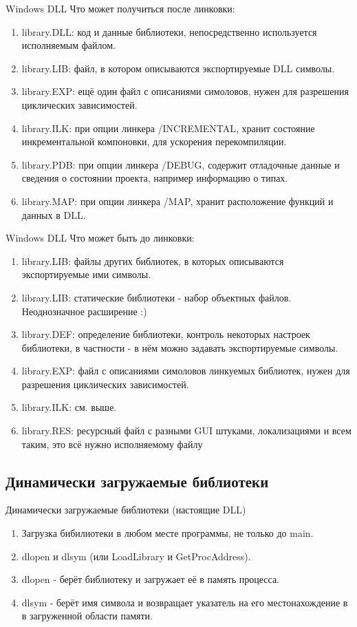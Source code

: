 \documentclass[10pt]{beamer}
\begin{document}
\begin{frame}{Windows DLL}
Что может получиться после линковки:
    \begin{enumerate}
        \item library.DLL: код и данные библиотеки, непосредственно используется исполняемым файлом.
        \item library.LIB: файл, в котором описываются экспортируемые DLL символы.
        \item library.EXP: ещё один файл с описаниями симоловов, нужен для разрешения циклических зависимостей.
        \item library.ILK: при опции линкера /INCREMENTAL, хранит состояние инкрементальной компоновки, для ускорения перекомпиляции.
        \item library.PDB: при опции линкера /DEBUG, содержит отладочные данные и сведения о состоянии проекта, например информацию о типах.
        \item library.MAP: при опции линкера /MAP, хранит расположение функций и данных в DLL.
    \end{enumerate}
\end{frame}
\begin{frame}{Windows DLL}
Что может быть до линковки:
    \begin{enumerate}
        \item library.LIB: файлы других библиотек, в которых описываются экспортируемые ими символы.
        \item library.LIB: статические библиотеки - набор объектных файлов. Неоднозначное расширение :)
        \item library.DEF: определение библиотеки, контроль некоторых настроек библиотеки, в частности - в нём можно задавать экспортируемые символы.
        \item library.EXP: файл с описаниями симоловов линкуемых библиотек, нужен для разрешения циклических зависимостей.
        \item library.ILK: см. выше.
        \item library.RES: ресурсный файл с разными GUI штуками, локализациями и всем таким, это всё нужно исполняемому файлу
    \end{enumerate}
\end{frame}

\subsection{Динамически загружаемые библиотеки}
\begin{frame}{Динамически загружаемые библиотеки (настоящие DLL)}
\begin{enumerate}
\item Загрузка бибилиотеки в любом месте программы, не только до main.
\item dlopen и dlsym (или LoadLibrary и GetProcAddress).
\item dlopen - берёт библиотеку и загружает её в память процесса.
\item dlsym - берёт имя символа и возвращает указатель на его местонахождение в в загруженной области памяти.
\end{enumerate}
\end{frame}
\end{document}
